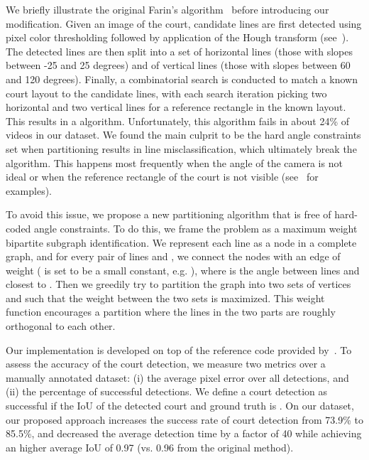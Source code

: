 We briefly illustrate the original Farin's algorithm~\cite{FKWE04} before introducing our modification. Given an image of the court, candidate lines are first detected using pixel color thresholding followed by application of the Hough transform (see~). The detected lines are then split into a set  of horizontal lines (those with slopes between -25 and 25 degrees) and  of vertical lines (those with slopes between 60 and 120 degrees). Finally, a combinatorial search is conducted to match a known court layout to the candidate lines, with each search iteration picking two horizontal and two vertical lines for a reference rectangle in the known layout. This results in a  algorithm. Unfortunately, this algorithm fails in about 24\% of videos in our dataset. We found the main culprit to be the hard angle constraints set when partitioning results in line misclassification, which ultimately break the algorithm. This happens most frequently when the angle of the camera is not ideal or when the reference rectangle of the court is not visible (see~ for examples).

To avoid this issue, we propose a new partitioning algorithm that is free of hard-coded angle constraints. To do this, we frame the problem as a maximum weight bipartite subgraph identification. We represent each line as a node in a complete graph, and for every pair of lines  and , we connect the nodes with an edge of weight  ( is set to be a small constant, e.g. ), where  is the angle between lines  and  closest to . Then we greedily try to partition the graph into two sets of vertices  and  such that the weight between the two sets is maximized. This weight function encourages a partition where the lines in the two parts are roughly orthogonal to each other.

Our implementation is developed on top of the reference code provided by~\cite{court_detect}. To assess the accuracy of the court detection, we measure two metrics over a manually annotated dataset: (i) the average pixel error over all detections, and (ii) the percentage of successful detections. We define a court detection as successful if the IoU of the detected court and ground truth is . On our dataset, our proposed approach increases the success rate of court detection from 73.9\% to 85.5\%, and decreased the average detection time by a factor of 40 while achieving an higher average IoU of 0.97 (vs. 0.96 from the original method).

